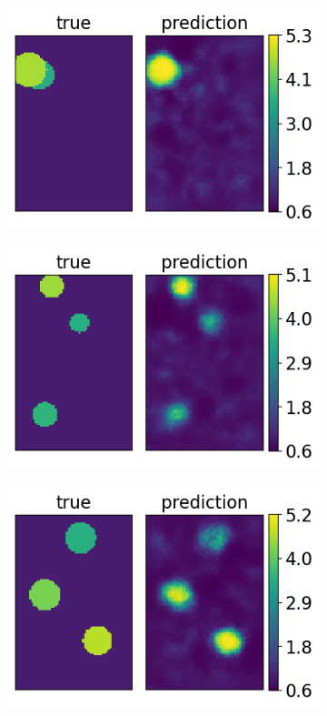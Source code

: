 \documentclass[12pt]{article}
\newcommand{\nhgappwidth}{0.24\linewidth}
\newcommand{\nhgappheight}{2.9cm}
\begin{document}
\begin{appendices}
\begin{figure}[!h]
\begin{subfigure}[c]{\nhgappwidth}
  \end{subfigure}
  \begin{subfigure}[c]{\nhgappwidth}
    \centering    
    \includegraphics[totalheight=\nhgappheight]{Figures/AppendixNew/CNN3/ex10/mu.png}
  \end{subfigure}
  \begin{subfigure}[c]{\nhgappwidth}
    \centering
    \includegraphics[totalheight=\nhgappheight]{Figures/AppendixNew/CNN3/ex11/mu.png}
  \end{subfigure}
  \begin{subfigure}[c]{\nhgappwidth}
    \centering
    \includegraphics[totalheight=\nhgappheight]{Figures/AppendixNew/CNN3/ex12/mu.png}

\end{subfigure}
\end{figure}
\end{appendices}
\end{document}
